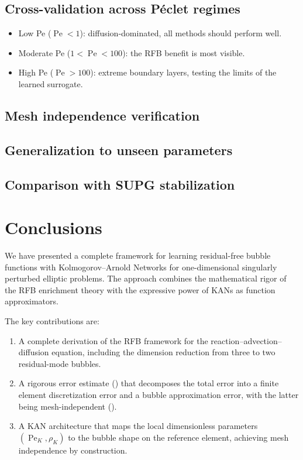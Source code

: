 \documentclass[11pt]{article}
\newcommand{\Pe}{\operatorname{Pe}}
\theoremstyle{remark}
\begin{document}
\subsection{Cross-validation across P\'{e}clet regimes}
\begin{itemize}[nosep]
    \item Low Pe ($\Pe < 1$): diffusion-dominated, all methods should perform well.
    \item Moderate Pe ($1 < \Pe < 100$): the RFB benefit is most visible.
    \item High Pe ($\Pe > 100$): extreme boundary layers, testing the limits of the learned surrogate.
\end{itemize}

\subsection{Mesh independence verification}
\subsection{Generalization to unseen parameters}
\subsection{Comparison with SUPG stabilization}

\section{Conclusions}
\label{sec:conclusion}

We have presented a complete framework for learning residual-free bubble functions with Kolmogorov--Arnold Networks for one-dimensional singularly perturbed elliptic problems. The approach combines the mathematical rigor of the RFB enrichment theory with the expressive power of KANs as function approximators.

The key contributions are:
\begin{enumerate}[nosep]
    \item A complete derivation of the RFB framework for the reaction--advection--diffusion equation, including the dimension reduction from three to two residual-mode bubbles.
    \item A rigorous error estimate () that decomposes the total error into a finite element discretization error and a bubble approximation error, with the latter being mesh-independent ().
    \item A KAN architecture that maps the local dimensionless parameters $(\Pe_K, \rho_K)$ to the bubble shape on the reference element, achieving mesh independence by construction.
\end{enumerate}
\end{document}
